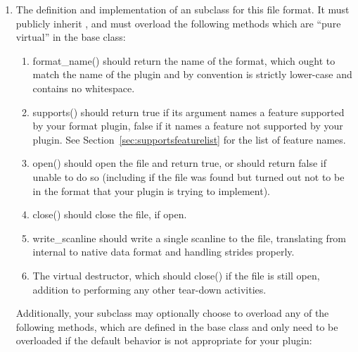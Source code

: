 \begin{enumerate}
\item The definition and implementation of an \ImageOutput subclass for
  this file format.  It must publicly inherit \ImageOutput, and must
  overload the following methods which are ``pure virtual'' in the
  \ImageOutput base class:

  \begin{enumerate}
    \item {\cf format_name()} should return the name of the format, which
      ought to match the name of the plugin and by convention is
      strictly lower-case and contains no whitespace.
    \item {\cf supports()} should return {\cf true} if its argument
      names a feature supported by your format plugin, {\cf false} if it
      names a feature not supported by your plugin.  See
      Section~\ref{sec:supportsfeaturelist} for the list of feature
      names.
    \item {\cf open()} should open the file and return true, or should
      return false if unable to do so (including if the file was found
      but turned out not to be in the format that your plugin is trying
      to implement).
    \item {\cf close()} should close the file, if open.
    \item {\cf write_scanline} should write a single scanline to
      the file, translating from internal to native data format and
      handling strides properly.
    \item The virtual destructor, which should {\cf close()} if the file
      is still open, addition to performing any other tear-down activities.
  \end{enumerate}
  
  Additionally, your \ImageOutput subclass may optionally choose to
  overload any of the following methods, which are defined in the
  \ImageOutput base class and only need to be overloaded if the default
  behavior is not appropriate for your plugin:


\end{enumerate}
